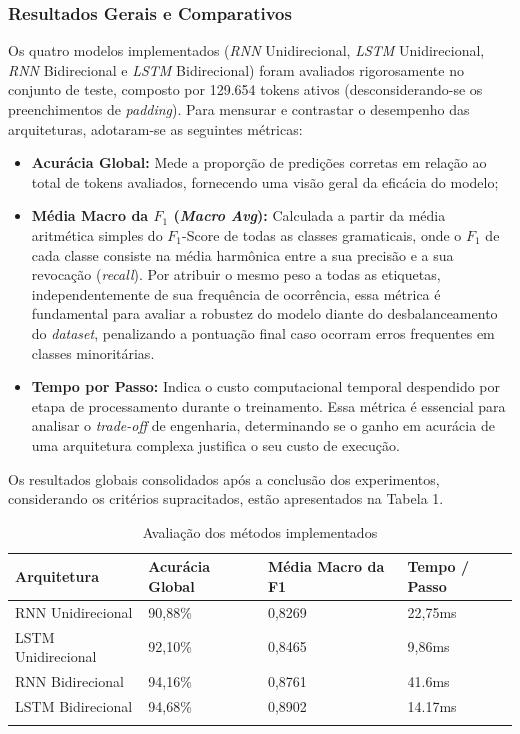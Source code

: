 \documentclass[a4paper,12pt]{article}
\begin{document}
\subsubsection{Resultados Gerais e Comparativos}
Os quatro modelos implementados (\textit{RNN} Unidirecional, \textit{LSTM} Unidirecional, \textit{RNN} Bidirecional e \textit{LSTM} Bidirecional) foram avaliados rigorosamente no conjunto de teste, composto por 129.654 tokens ativos (desconsiderando-se os preenchimentos de \textit{padding}). Para mensurar e contrastar o desempenho das arquiteturas, adotaram-se as seguintes métricas:

\begin{itemize}
\item \textbf{Acurácia Global:} Mede a proporção de predições corretas em relação ao total de tokens avaliados, fornecendo uma visão geral da eficácia do modelo;

\item \textbf{Média Macro da $F_1$ (\textit{Macro Avg}):} Calculada a partir da média aritmética simples do $F_1$-Score de todas as classes gramaticais, onde o $F_1$ de cada classe consiste na média harmônica entre a sua precisão e a sua revocação (\textit{recall}). Por atribuir o mesmo peso a todas as etiquetas, independentemente de sua frequência de ocorrência, essa métrica é fundamental para avaliar a robustez do modelo diante do desbalanceamento do \textit{dataset}, penalizando a pontuação final caso ocorram erros frequentes em classes minoritárias.

\item \textbf{Tempo por Passo:} Indica o custo computacional temporal despendido por etapa de processamento durante o treinamento. Essa métrica é essencial para analisar o \textit{trade-off} de engenharia, determinando se o ganho em acurácia de uma arquitetura complexa justifica o seu custo de execução.

\end{itemize}

Os resultados globais consolidados após a conclusão dos experimentos, considerando os critérios supracitados, estão apresentados na Tabela 1.

\begin{longtable}{|C{4cm}|C{3cm}|C{4cm}|C{2cm}|}
\hline
\textbf{Arquitetura} & \textbf{Acurácia Global} & \textbf{Média Macro da F1}  & \textbf{Tempo / Passo} \\ \hline
RNN Unidirecional  & 90,88\% & 0,8269  & 22,75ms \\ \hline
LSTM Unidirecional & 92,10\% & 0,8465 & 9,86ms \\ \hline
RNN Bidirecional   & 94,16\% & 0,8761 & 41.6ms \\ \hline
LSTM Bidirecional  & 94,68\% & 0,8902 & 14.17ms \\ \hline
\caption{Avaliação dos métodos implementados} \\
\end{longtable} 
\end{document}
